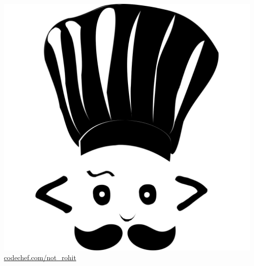 \documentclass[A4,11pt]{article}
\begin{document}
\begin{minipage}[c]{0.4\textwidth}
    \href{https://www.codechef.com/users/not_rohit}{\hspace{3pt}\includegraphics[scale=0.008]{components/codechef.jpg} \underline{codechef.com/not\_rohit}} \\
    
\end{minipage}

\vspace*{2pt}

\end{document}
